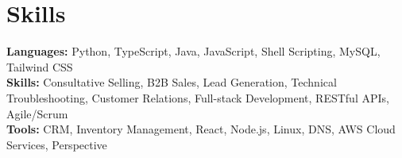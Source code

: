 \documentclass[11pt]{article}       %
\begin{document}

\vspace{-18.5pt}


\section*{Skills}
\textbf{Languages:} Python, TypeScript, Java, JavaScript, Shell Scripting, MySQL, Tailwind CSS\\
\textbf{Skills:} Consultative Selling, B2B Sales, Lead Generation, Technical Troubleshooting, Customer Relations, Full-stack Development, RESTful APIs, Agile/Scrum\\
\textbf{Tools:} CRM, Inventory Management, React, Node.js, Linux, DNS, AWS Cloud Services, Perspective\\

\vspace{-6.5pt}
\end{document}
